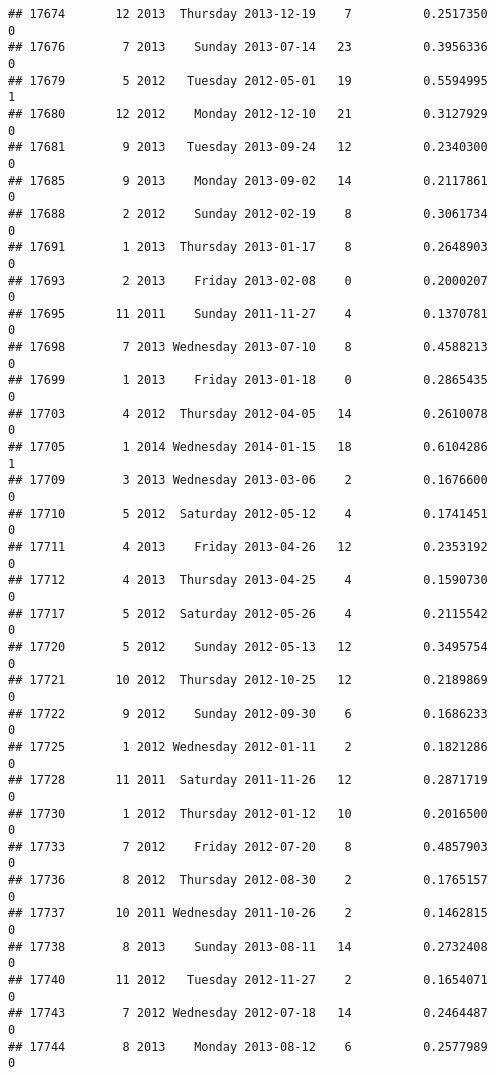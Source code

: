 \documentclass[
]{article}
\begin{document}
\begin{verbatim}
## 17674       12 2013  Thursday 2013-12-19    7          0.2517350             0
## 17676        7 2013    Sunday 2013-07-14   23          0.3956336             0
## 17679        5 2012   Tuesday 2012-05-01   19          0.5594995             1
## 17680       12 2012    Monday 2012-12-10   21          0.3127929             0
## 17681        9 2013   Tuesday 2013-09-24   12          0.2340300             0
## 17685        9 2013    Monday 2013-09-02   14          0.2117861             0
## 17688        2 2012    Sunday 2012-02-19    8          0.3061734             0
## 17691        1 2013  Thursday 2013-01-17    8          0.2648903             0
## 17693        2 2013    Friday 2013-02-08    0          0.2000207             0
## 17695       11 2011    Sunday 2011-11-27    4          0.1370781             0
## 17698        7 2013 Wednesday 2013-07-10    8          0.4588213             0
## 17699        1 2013    Friday 2013-01-18    0          0.2865435             0
## 17703        4 2012  Thursday 2012-04-05   14          0.2610078             0
## 17705        1 2014 Wednesday 2014-01-15   18          0.6104286             1
## 17709        3 2013 Wednesday 2013-03-06    2          0.1676600             0
## 17710        5 2012  Saturday 2012-05-12    4          0.1741451             0
## 17711        4 2013    Friday 2013-04-26   12          0.2353192             0
## 17712        4 2013  Thursday 2013-04-25    4          0.1590730             0
## 17717        5 2012  Saturday 2012-05-26    4          0.2115542             0
## 17720        5 2012    Sunday 2012-05-13   12          0.3495754             0
## 17721       10 2012  Thursday 2012-10-25   12          0.2189869             0
## 17722        9 2012    Sunday 2012-09-30    6          0.1686233             0
## 17725        1 2012 Wednesday 2012-01-11    2          0.1821286             0
## 17728       11 2011  Saturday 2011-11-26   12          0.2871719             0
## 17730        1 2012  Thursday 2012-01-12   10          0.2016500             0
## 17733        7 2012    Friday 2012-07-20    8          0.4857903             0
## 17736        8 2012  Thursday 2012-08-30    2          0.1765157             0
## 17737       10 2011 Wednesday 2011-10-26    2          0.1462815             0
## 17738        8 2013    Sunday 2013-08-11   14          0.2732408             0
## 17740       11 2012   Tuesday 2012-11-27    2          0.1654071             0
## 17743        7 2012 Wednesday 2012-07-18   14          0.2464487             0
## 17744        8 2013    Monday 2013-08-12    6          0.2577989             0

\end{verbatim}
\end{document}

